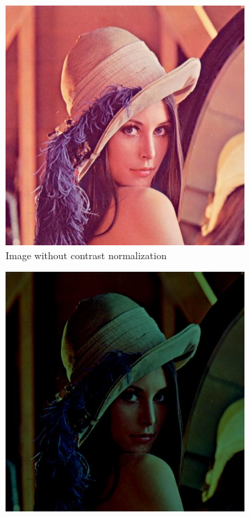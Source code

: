 \documentclass{article} %
\begin{document}
\begin{figure}
\begin{subfigure}{0.33\textwidth}
\centering
\includegraphics[scale=0.2]{lena}
\caption{Image without contrast normalization}
\end{subfigure}
\begin{subfigure}{0.33\textwidth}
\centering
\includegraphics[scale=0.2]{lena_contrast}

\end{subfigure}
\end{figure}
\end{document}
